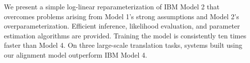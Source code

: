 We present a simple log-linear reparameterization of IBM Model 2 that overcomes problems arising from Model 1's strong assumptions and Model 2's
 overparameterization.  Efficient inference, likelihood evaluation, and
 parameter estimation algorithms are provided.  Training the model is
 consistently ten times faster than Model 4.  On three large-scale translation
 tasks, systems built using our alignment model outperform IBM Model 4.

